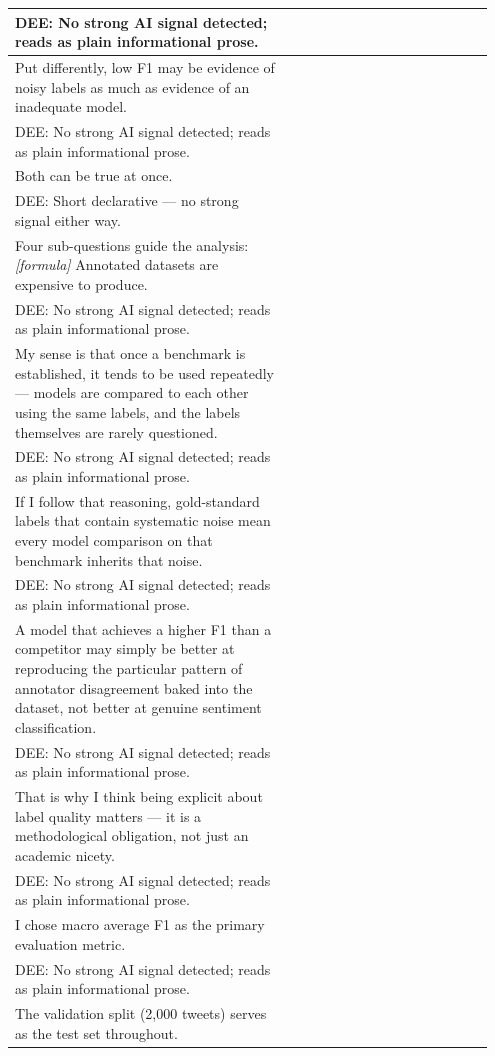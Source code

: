 \documentclass[11pt]{article}
\begin{document}
\begin{longtable}{|p{0.55\linewidth}|p{0.40\linewidth}|}
\hline
DEE: No strong AI signal detected; reads as plain informational prose. & \\
\hline
Put differently, low F1 may be evidence of noisy labels as much as evidence of an inadequate model. & \\[2pt]
\hline
DEE: No strong AI signal detected; reads as plain informational prose. & \\
\hline
Both can be true at once. & \\[2pt]
\hline
DEE: Short declarative --- no strong signal either way. & \\
\hline
Four sub-questions guide the analysis: \textit{[formula]} Annotated datasets are expensive to produce. & \\[2pt]
\hline
DEE: No strong AI signal detected; reads as plain informational prose. & \\
\hline
My sense is that once a benchmark is established, it tends to be used repeatedly --- models are compared to each other using the same labels, and the labels themselves are rarely questioned. & \\[2pt]
\hline
DEE: No strong AI signal detected; reads as plain informational prose. & \\
\hline
If I follow that reasoning, gold-standard labels that contain systematic noise mean every model comparison on that benchmark inherits that noise. & \\[2pt]
\hline
DEE: No strong AI signal detected; reads as plain informational prose. & \\
\hline
A model that achieves a higher F1 than a competitor may simply be better at reproducing the particular pattern of annotator disagreement baked into the dataset, not better at genuine sentiment classification. & \\[2pt]
\hline
DEE: No strong AI signal detected; reads as plain informational prose. & \\
\hline
That is why I think being explicit about label quality matters --- it is a methodological obligation, not just an academic nicety. & \\[2pt]
\hline
DEE: No strong AI signal detected; reads as plain informational prose. & \\
\hline
I chose macro average F1 as the primary evaluation metric. & \\[2pt]
\hline
DEE: No strong AI signal detected; reads as plain informational prose. & \\
\hline
The validation split (2,000 tweets) serves as the test set throughout. & \\[2pt]

\end{longtable}
\end{document}
